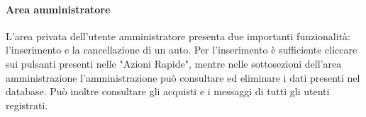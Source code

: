         \paragraph{Area amministratore} L'area privata dell'utente amministratore presenta due importanti funzionalità: l'inserimento e la cancellazione di un auto. Per l'inserimento è sufficiente cliccare sui pulsanti presenti nelle "Azioni Rapide", mentre nelle sottosezioni dell'area amministrazione l'amministrazione può consultare ed eliminare i dati presenti nel database. Può inoltre consultare gli acquisti e i messaggi di tutti gli utenti registrati.


\pagebreak
